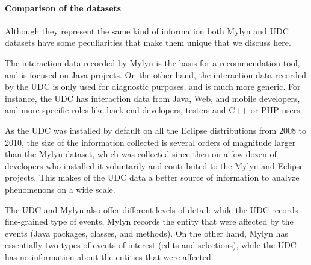\documentclass[times]{smrauth}
\begin{document}
\paragraph{Comparison of the datasets}
Although they represent the same kind of information both Mylyn and UDC datasets have some peculiarities that make them unique that we discuss here.

The interaction data recorded by Mylyn is the basis for a recommendation tool, and is focused on Java projects. On the other hand, the interaction data recorded by the UDC is only used for diagnostic purposes, and is much more generic. For instance, the UDC has interaction data from Java, Web, and mobile developers, and more specific roles like back-end developers, testers and C++ or PHP users. 

As the UDC was installed by default on all the Eclipse distributions from 2008 to 2010, the size of the information collected is several orders of magnitude larger than the Mylyn dataset, which was collected since then on a few dozen of developers who installed it voluntarily and contributed to the Mylyn and Eclipse projects. This makes of the UDC data a better source of information to analyze phenomenons on a wide scale.

The UDC and Mylyn also offer different levels of detail: while the UDC records fine-grained type of events, Mylyn records the entity that were affected by the events (Java packages, classes, and methods). On the other hand, Mylyn has essentially two types of events of interest (edits and selections), while the UDC has no information about the entities that were affected.




\end{document}
